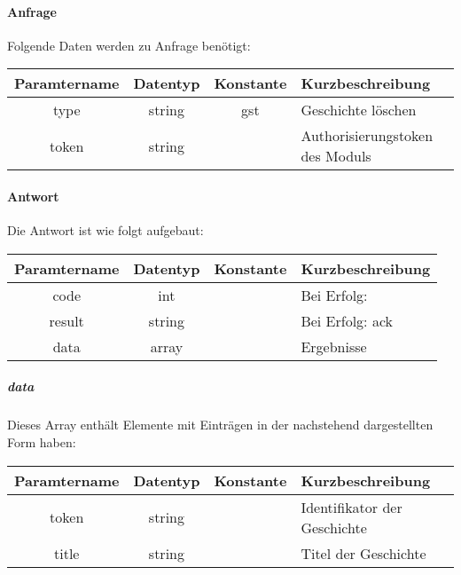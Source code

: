 \paragraph{Anfrage}Folgende Daten werden zu Anfrage benötigt:
\begin{table}[H]
	\begin{tabular}{|c|c|c|p{6.5cm}|}
		\hline
		\textbf{Paramtername} & \textbf{Datentyp} & \textbf{Konstante} & \textbf{Kurzbeschreibung}                                                                                               \\ \hline
		type                & string            & gst                & Geschichte löschen \\ \hline
		token               & string            &                    & Authorisierungstoken des Moduls \\ \hline
	\end{tabular}
\end{table}
\paragraph{Antwort}Die Antwort ist wie folgt aufgebaut:
\begin{table}[H]
	\begin{tabular}{|c|c|c|p{6.5cm}|}
		\hline
		\textbf{Paramtername} & \textbf{Datentyp} & \textbf{Konstante} & \textbf{Kurzbeschreibung}            \\ \hline                
		code                & int              &                 & Bei Erfolg: {\glqq 0\grqq} \\ \hline
		result              & string           &                 & Bei Erfolg: {\glqq ack\grqq} \\ \hline
		data                & array            &                 & Ergebnisse \\ \hline
	\end{tabular}
\end{table}
\subparagraph{data}Dieses Array enthält Elemente mit Einträgen in der nachstehend dargestellten Form haben:
\begin{table}[H]
	\begin{tabular}{|c|c|c|p{6.5cm}|}
		\hline
		\textbf{Paramtername} & \textbf{Datentyp} & \textbf{Konstante} & \textbf{Kurzbeschreibung}    \\ \hline
		token              & string            &                 & Identifikator der Geschichte \\ \hline
		title              & string            &                 & Titel der Geschichte \\ \hline
	\end{tabular}
\end{table}
